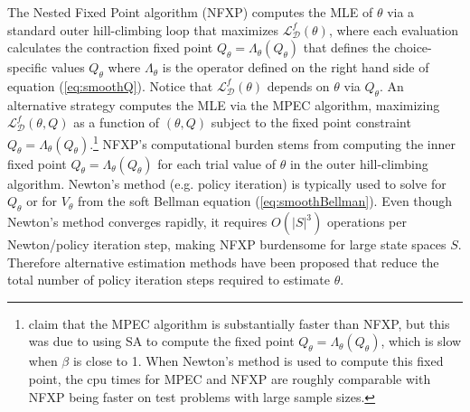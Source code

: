 The Nested Fixed Point algorithm (NFXP) \citep{rust:1988} computes the MLE of $\theta$ via a standard outer hill-climbing loop that maximizes $\mathcal{L}^f_{\mathcal{D}}(\theta)$, where each evaluation calculates
the contraction fixed point $Q_\theta=\Lambda_\theta(Q_\theta)$ that defines the choice-specific values $Q_\theta$ where $\Lambda_\theta$
is the operator defined on the right hand side of equation (\ref{eq:smoothQ}).
Notice that $\mathcal{L}^f_{\mathcal{D}}(\theta)$ depends on $\theta$ via $Q_\theta$. An alternative strategy \citep{sujudd:2012}
computes the MLE via the MPEC algorithm, maximizing $\mathcal{L}^f_{\mathcal{D}}(\theta,Q)$ as a function of $(\theta,Q)$
subject to the fixed point constraint $Q_\theta=\Lambda_\theta(Q_\theta)$.\footnote{\footnotesize \citet{sujudd:2012} claim that the
MPEC algorithm is substantially faster than NFXP, but this was due to using SA \citep{sujuddcomment:2016}
to compute the fixed point $Q_\theta=\Lambda_\theta(Q_\theta)$, which is slow when $\beta$ is close to 1. When Newton's method is used
to compute this fixed point, the cpu times for MPEC and NFXP are roughly comparable with NFXP being faster on test problems with
large sample sizes.}
NFXP's computational burden stems from computing the inner fixed point $Q_\theta=\Lambda_\theta(Q_\theta)$
for each trial value of $\theta$ in the outer hill-climbing algorithm. 
Newton's method (e.g. policy iteration) is typically used to solve for $Q_\theta$ or for $V_\theta$ from 
the soft Bellman equation (\ref{eq:smoothBellman}). Even though  Newton's method converges rapidly, it requires $O(|S|^3)$ operations per Newton/policy
iteration step, making NFXP burdensome for large state spaces $S$. Therefore alternative estimation methods have been proposed that 
reduce the total number of policy iteration steps required to estimate $\theta$.


